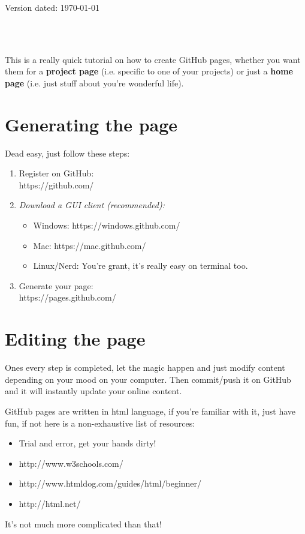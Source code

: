 \documentclass[a4paper,11pt]{article}
\begin{document}
\begin{flushright}
Version dated: \today
\end{flushright}
\bigskip
\begin{center}

\\
\bigskip
\\

\end{center}

\raggedright
 \pagestyle{empty}

This is a really quick tutorial on how to create GitHub pages, whether you want them for a \textbf{project page} (i.e. specific to one of your projects) or just a \textbf{home page} (i.e. just stuff about you're wonderful life).

\section{Generating the page}
Dead easy, just follow these steps:
\begin{enumerate}
\item{Register on GitHub:}\\
https://github.com/

\item{\textit{Download a GUI client (recommended):}}\\
\begin{itemize}
\item{Windows: https://windows.github.com/}
\item{Mac: https://mac.github.com/}
\item{Linux/Nerd: You're grant, it's really easy on terminal too.}
\end{itemize}

\item{Generate your page:}\\
https://pages.github.com/
\end{enumerate}

\section{Editing the page}
Ones every step is completed, let the magic happen and just modify content depending on your mood on your computer. Then commit/push it on GitHub and it will instantly update your online content.

GitHub pages are written in html language, if you're familiar with it, just have fun, if not here is a non-exhaustive list of resources:
\begin{itemize}
\item{Trial and error, get your hands dirty!}
\item{http://www.w3schools.com/}
\item{http://www.htmldog.com/guides/html/beginner/}
\item{http://html.net/}
\end{itemize}

It's not much more complicated than that!
\end{document}
